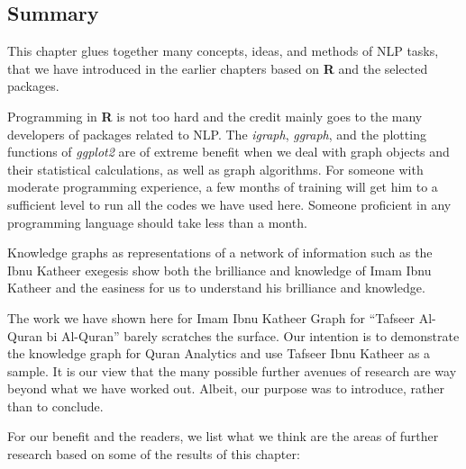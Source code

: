 \documentclass[
]{article}
\begin{document}
\hypertarget{summary-chapter-9}{%
\subsection{Summary}\label{summary-chapter-9}}

This chapter glues together many concepts, ideas, and methods of NLP tasks, that we have introduced in the earlier chapters based on \textbf{R} and the selected packages.

Programming in \textbf{R} is not too hard and the credit mainly goes to the many developers of packages related to NLP. The \emph{igraph}, \emph{ggraph}, and the plotting functions of \emph{ggplot2} are of extreme benefit when we deal with graph objects and their statistical calculations, as well as graph algorithms. For someone with moderate programming experience, a few months of training will get him to a sufficient level to run all the codes we have used here. Someone proficient in any programming language should take less than a month.

Knowledge graphs as representations of a network of information such as the Ibnu Katheer exegesis show both the brilliance and knowledge of Imam Ibnu Katheer and the easiness for us to understand his brilliance and knowledge.

The work we have shown here for Imam Ibnu Katheer Graph for ``Tafseer Al-Quran bi Al-Quran'' barely scratches the surface. Our intention is to demonstrate the knowledge graph for Quran Analytics and use Tafseer Ibnu Katheer as a sample. It is our view that the many possible further avenues of research are way beyond what we have worked out. Albeit, our purpose was to introduce, rather than to conclude.

For our benefit and the readers, we list what we think are the areas of further research based on some of the results of this chapter:
\end{document}
